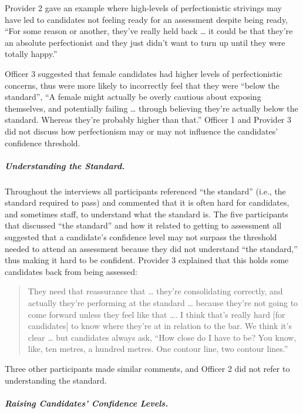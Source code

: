 \documentclass[
  12pt,
  a4paper,
]{book}
\begin{document}
Provider 2 gave an example where high-levels of perfectionistic strivings may have led to candidates not feeling ready for an assessment despite being ready, ``For some reason or another, they've really held back \ldots{} it could be that they're an absolute perfectionist and they just didn't want to turn up until they were totally happy.''

Officer 3 suggested that female candidates had higher levels of perfectionistic concerns, thus were more likely to incorrectly feel that they were ``below the standard'', ``A female might actually be overly cautious about exposing themselves, and potentially failing \ldots{} through believing they're actually below the standard. Whereas they're probably higher than that.'' Officer 1 and Provider 3 did not discuss how perfectionism may or may not influence the candidates' confidence threshold.

\hypertarget{ml-qualitative-gta-understanding-the-standard}{%
\subparagraph{Understanding the Standard.}\label{ml-qualitative-gta-understanding-the-standard}}

Throughout the interviews all participants referenced ``the standard'' (i.e., the standard required to pass) and commented that it is often hard for candidates, and sometimes staff, to understand what the standard is. The five participants that discussed ``the standard'' and how it related to getting to assessment all suggested that a candidate's confidence level may not surpass the threshold needed to attend an assessment because they did not understand ``the standard,'' thus making it hard to be confident. Provider 3 explained that this holds some candidates back from being assessed:

\begin{quote}
They need that reassurance that \ldots{} they're consolidating correctly, and actually they're performing at the standard \ldots{} because they're not going to come forward unless they feel like that \ldots. I think that's really hard {[}for candidates{]} to know where they're at in relation to the bar. We think it's clear \ldots{} but candidates always ask, ``How close do I have to be? You know, like, ten metres, a hundred metres. One contour line, two contour lines.''
\end{quote}

Three other participants made similar comments, and Officer 2 did not refer to understanding the standard.

\hypertarget{raising-candidates-confidence-levels.}{%
\subparagraph{Raising Candidates' Confidence Levels.}\label{raising-candidates-confidence-levels.}}
\end{document}
